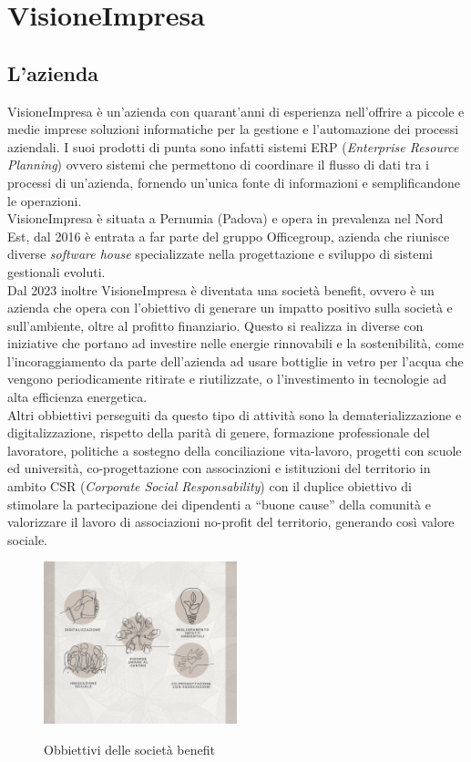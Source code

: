 \chapter{VisioneImpresa}\label{chap:VisioneImpresa}

\section{L'azienda}
VisioneImpresa è un'azienda con quarant'anni di esperienza nell'offrire a piccole e medie imprese soluzioni informatiche per la 
gestione e l'automazione dei processi aziendali. I suoi prodotti di punta sono infatti sistemi ERP (\textit{Enterprise 
Resource Planning}) ovvero sistemi che permettono di coordinare il flusso di dati tra i processi di un'azienda, fornendo un'unica fonte di 
informazioni e semplificandone le operazioni.\\
VisioneImpresa è situata a Pernumia (Padova) e opera in prevalenza nel Nord Est, dal 2016 è entrata a far parte del gruppo Officegroup, azienda 
che riunisce diverse \textit{software house} specializzate nella progettazione e sviluppo di sistemi gestionali evoluti.\\
Dal 2023 inoltre VisioneImpresa è diventata una società benefit, ovvero è un azienda che opera con l'obiettivo di generare un impatto positivo 
sulla società e sull'ambiente, oltre al profitto finanziario.
Questo si realizza in diverse con iniziative che portano ad investire nelle energie rinnovabili e la sostenibilità, come 
l'incoraggiamento da parte dell'azienda ad usare bottiglie in vetro per l'acqua che vengono periodicamente ritirate e 
riutilizzate, o l'investimento in tecnologie ad alta efficienza energetica.\\
Altri obbiettivi perseguiti da questo tipo di attività sono la dematerializzazione e digitalizzazione, rispetto della parità di 
genere, formazione professionale del lavoratore, politiche a sostegno della conciliazione vita-lavoro, progetti con scuole ed 
università, co-progettazione con associazioni e istituzioni del territorio in ambito CSR 
(\textit{Corporate Social Responsability}) con il duplice obiettivo di stimolare la partecipazione dei dipendenti a 
“buone cause” della comunità e valorizzare il lavoro di associazioni no-profit del territorio, generando così valore sociale.

\begin{figure}[H]
    \centering
    \includegraphics[alt={Obbiettivi delle società benefit}, width=0.5\textwidth]{img/soc-benefit.png}
    \caption{Obbiettivi delle società benefit}
    \label{fig:società benefit}
\end{figure}


